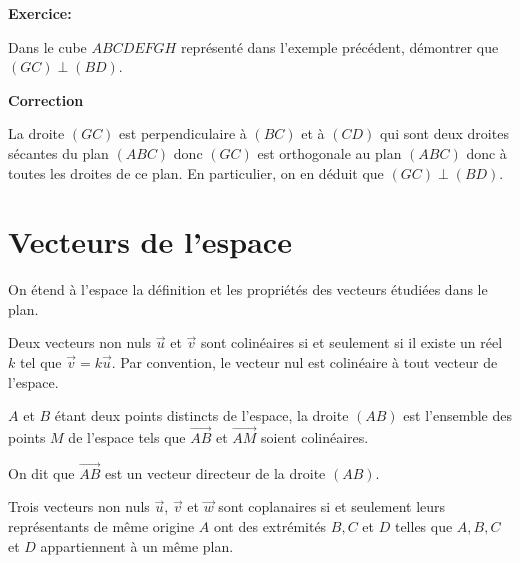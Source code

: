 \documentclass{cornouaille}
\begin{document}
\begin{methode}

  

\textbf{Exercice:}



  Dans le cube $ABCDEFGH$ représenté dans l'exemple précédent,
  démontrer que $(GC)\perp (BD)$.

  

\textbf{Correction}



  La droite $(GC)$ est perpendiculaire à $(BC)$ et à $(CD)$ qui sont
  deux droites sécantes du plan $(ABC)$ donc $(GC)$ est orthogonale au
  plan $(ABC)$ donc à toutes les droites de ce plan. En particulier,
  on en déduit que $(GC)\perp (BD)$.
\end{methode}

\section{Vecteurs de l'espace}

\begin{remarque}
  On étend à l'espace la définition et les propriétés des
  vecteurs étudiées dans le plan.
\end{remarque}

\begin{proprietes}
  Deux vecteurs non nuls $\vec{u}$ et $\vec{v}$ sont colinéaires si et
  seulement si il existe un réel $k$ tel que $\vec{v}=k \vec{u}$.  Par
  convention, le vecteur nul est colinéaire à tout vecteur de
  l'espace.
\end{proprietes}

\begin{propriete}[Caractéristique]
  $A$ et  $B$ étant deux points distincts de l'espace, la droite
  $(AB)$ est l'ensemble des points $M$ de l'espace tels que
  $\overrightarrow{AB}$ et $\overrightarrow{AM}$ soient colinéaires.

  On dit que $\overrightarrow{AB}$ est un vecteur directeur de la
  droite $(AB)$.
\end{propriete}

\begin{definition}
  Trois vecteurs non nuls $\vec{u}$, $\vec{v}$ et $\vec{w}$ sont
  coplanaires si et seulement leurs représentants de même origine $A$
  ont des extrémités $B,C$ et $D$ telles que $A, B, C$ et $D$
  appartiennent à un même plan.
\end{definition}
\end{document}
